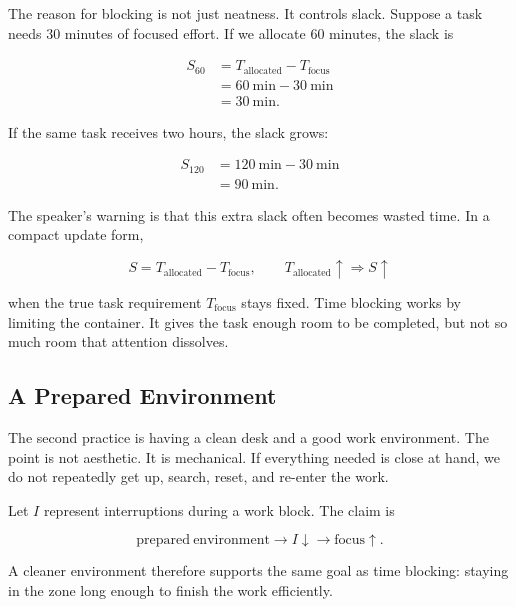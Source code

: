 The reason for blocking is not just neatness. It controls slack. Suppose a task needs \(30\) minutes of focused effort. If we allocate \(60\) minutes, the slack is

\begin{align}
S_{60}
&=
T_{\mathrm{allocated}} - T_{\mathrm{focus}} \\
&=
60\ \mathrm{min} - 30\ \mathrm{min} \\
&=
30\ \mathrm{min}.
\end{align}

If the same task receives two hours, the slack grows:

\begin{align}
S_{120}
&=
120\ \mathrm{min} - 30\ \mathrm{min} \\
&=
90\ \mathrm{min}.
\end{align}

The speaker's warning is that this extra slack often becomes wasted time. In a compact update form,

\begin{equation}
S
=
T_{\mathrm{allocated}}
-
T_{\mathrm{focus}},
\qquad
T_{\mathrm{allocated}} \uparrow
\Rightarrow
S \uparrow
\end{equation}

when the true task requirement \(T_{\mathrm{focus}}\) stays fixed. Time blocking works by limiting the container. It gives the task enough room to be completed, but not so much room that attention dissolves.

\subsection{A Prepared Environment}

The second practice is having a clean desk and a good work environment. The point is not aesthetic. It is mechanical. If everything needed is close at hand, we do not repeatedly get up, search, reset, and re-enter the work.

Let \(I\) represent interruptions during a work block. The claim is

\begin{equation}
\mathrm{prepared\ environment}
\longrightarrow
I \downarrow
\longrightarrow
\mathrm{focus} \uparrow .
\end{equation}

A cleaner environment therefore supports the same goal as time blocking: staying in the zone long enough to finish the work efficiently.

